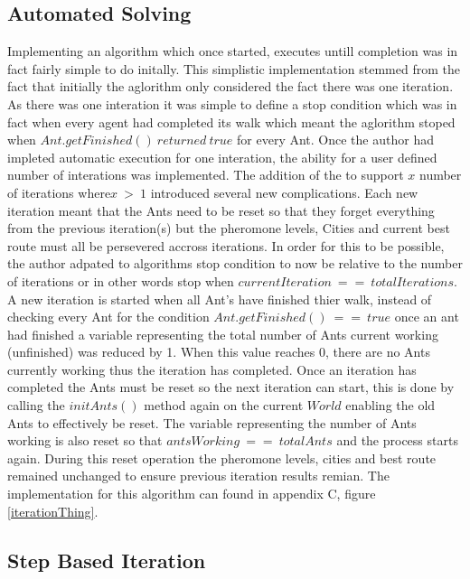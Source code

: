 \subsection{Automated Solving}
\label{autoSolve}
Implementing an algorithm which once started, executes untill completion was in fact fairly simple to do initally. This simplistic implementation stemmed from the fact that initially the aglorithm only considered the fact there was one iteration. As there was one interation it was simple to define a stop condition which was in fact when every agent had completed its walk which meant the aglorithm stoped when $Ant.getFinished()\ returned\ true$ for every Ant. Once the author had impleted automatic execution for one interation, the ability for a user defined number of interations was implemented. The addition of the to support $x$ number of iterations where$x\ >\ 1$ introduced several new complications. Each new iteration meant that the Ants need to be reset so that they forget everything from the previous iteration(s) but the pheromone levels, Cities and current best route must all be persevered accross iterations. In order for this to be possible, the author adpated to algorithms stop condition to now be relative to the number of iterations or in other words stop when $currentIteration\ ==\ totalIterations$. A new iteration is started when all Ant's have finished thier walk, instead of checking every Ant for the condition $Ant.getFinished()\ ==\ true$ once an ant had finished a variable representing the total number of Ants current working (unfinished) was reduced by 1. When this value reaches 0, there are no Ants currently working thus the iteration has completed. Once an iteration has completed the Ants must be reset so the next iteration can start, this is done by calling the $initAnts()$ method again on the current $World$ enabling the old Ants to effectively be reset. The variable representing the number of Ants working is also reset so that $antsWorking\ ==\ totalAnts$ and the process starts again. During this reset operation the pheromone levels, cities and best route remained unchanged to ensure previous iteration results remian. The implementation for this algorithm can found in appendix C, figure \ref{iterationThing}.

\subsection{Step Based Iteration}

